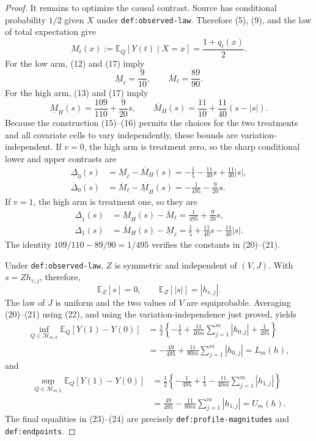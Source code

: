 \documentclass{article}
\begin{document}
\begin{proof}
It remains to optimize the causal contrast.  Source has conditional
probability \(1/2\) given \(X\) under
\texttt{def:observed-law}.  Therefore (5), (9), and the law of total
expectation give
\[
 M_t(x):=\mathbb E_Q[Y(t)\mid X=x]=\frac{1+q_t(x)}2.
 \tag{17}
\]
For the low arm, (12) and (17) imply
\[
 \underline M_{\ell}=\frac9{10},
 \qquad
 \overline M_{\ell}=\frac{89}{90}.
 \tag{18}
\]
For the high arm, (13) and (17) imply
\[
 \underline M_H(s)=\frac{109}{110}+\frac9{20}s,
 \qquad
 \overline M_H(s)=\frac{11}{10}
      +\frac{11}{40}(s-|s|).
 \tag{19}
\]
Because the construction (15)--(16) permits the choices for the two
treatments and all covariate cells to vary independently, these bounds
are variation-independent.  If \(v=0\), the high arm is treatment
zero, so the sharp conditional lower and upper contrasts are
\[
 \begin{aligned}
 \underline\Delta_0(s)
   &=\underline M_{\ell}-\overline M_H(s)
     =-\frac15-\frac{11}{40}s+\frac{11}{40}|s|,\\
 \overline\Delta_0(s)
   &=\overline M_{\ell}-\underline M_H(s)
     =-\frac1{495}-\frac9{20}s.
 \end{aligned}
 \tag{20}
\]
If \(v=1\), the high arm is treatment one, so they are
\[
 \begin{aligned}
 \underline\Delta_1(s)
   &=\underline M_H(s)-\overline M_{\ell}
     =\frac1{495}+\frac9{20}s,\\
 \overline\Delta_1(s)
   &=\overline M_H(s)-\underline M_{\ell}
     =\frac15+\frac{11}{40}s-\frac{11}{40}|s|.
 \end{aligned}
 \tag{21}
\]
The identity \(109/110-89/90=1/495\) verifies the constants in
(20)--(21).

Under \texttt{def:observed-law}, \(Z\) is symmetric and independent
of \((V,J)\).  With \(s=Zh_{v,j}\), therefore,
\[
 \mathbb E_Z[s]=0,
 \qquad
 \mathbb E_Z[|s|]=|h_{v,j}|.
 \tag{22}
\]
The law of \(J\) is uniform and the two values of \(V\) are
equiprobable.  Averaging (20)--(21) using (22), and using the
variation-independence just proved, yields
\[
 \begin{aligned}
 \inf_{Q\in\mathcal M_{m,h}}\mathbb E_Q[Y(1)-Y(0)]
 &=\frac12\left\{-\frac15+
       \frac{11}{40m}\sum_{j=1}^m|h_{0,j}|+\frac1{495}\right\}\\
 &=-\frac{49}{495}+\frac{11}{80m}
       \sum_{j=1}^m|h_{0,j}|=L_m(h),
 \end{aligned}
 \tag{23}
\]
and
\[
 \begin{aligned}
 \sup_{Q\in\mathcal M_{m,h}}\mathbb E_Q[Y(1)-Y(0)]
 &=\frac12\left\{-\frac1{495}+\frac15-
       \frac{11}{40m}\sum_{j=1}^m|h_{1,j}|\right\}\\
 &=\frac{49}{495}-\frac{11}{80m}
       \sum_{j=1}^m|h_{1,j}|=U_m(h).
 \end{aligned}
 \tag{24}
\]
The final equalities in (23)--(24) are precisely
\texttt{def:profile-magnitudes} and \texttt{def:endpoints}.


\end{proof}
\end{document}
